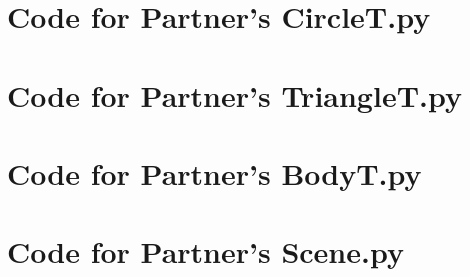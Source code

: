 \documentclass[12pt]{article}
\begin{document}
\noindent 

\newpage

\section{Code for Partner's CircleT.py}

\noindent 

\newpage

\section{Code for Partner's TriangleT.py}

\noindent 

\newpage

\section{Code for Partner's BodyT.py}

\noindent 

\newpage

\section{Code for Partner's Scene.py}

\noindent 

\newpage
\end{document}
